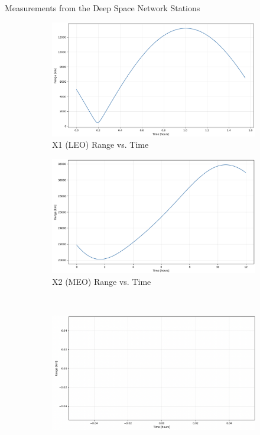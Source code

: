 \begin{hwkProblem}{4}{Measurements from the Deep Space Network Stations}
	\hwkPart{} \label{hwk:s04b}

	\begin{figure}[H] \label{fig:s04b}
		\begin{center}
			\begin{subfigure}{0.4\textwidth} \label{fig:s04b1}
				\includegraphics[width=\linewidth]{./outputs/figures/s04b1.png}
				\caption{X1 (LEO) Range vs. Time}
			\end{subfigure}
			\begin{subfigure}{0.4\textwidth} \label{fig:s04b2}
				\includegraphics[width=\linewidth]{./outputs/figures/s04b2.png}
				\caption{X2 (MEO) Range vs. Time}
			\end{subfigure}
			\\
			\begin{subfigure}{0.4\textwidth} \label{fig:s04b3}
				\includegraphics[width=\linewidth]{./outputs/figures/s04b3.png}

\end{subfigure}
\end{center}
\end{figure}
\end{hwkProblem}

